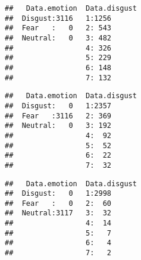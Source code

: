 \documentclass[
]{article}
\newenvironment{Shaded}{\begin{snugshade}}{\end{snugshade}}
\newcommand{\FunctionTok}[1]{\textcolor[rgb]{0.00,0.00,0.00}{#1}}
\newcommand{\NormalTok}[1]{#1}
\newcommand{\OtherTok}[1]{\textcolor[rgb]{0.56,0.35,0.01}{#1}}
\newcommand{\SpecialCharTok}[1]{\textcolor[rgb]{0.00,0.00,0.00}{#1}}
\newcommand{\StringTok}[1]{\textcolor[rgb]{0.31,0.60,0.02}{#1}}
\begin{document}
\begin{verbatim}
##   Data.emotion  Data.disgust
##  Disgust:3116   1:1256      
##  Fear   :   0   2: 543      
##  Neutral:   0   3: 482      
##                 4: 326      
##                 5: 229      
##                 6: 148      
##                 7: 132
\end{verbatim}

\begin{Shaded}
\end{Shaded}

\begin{verbatim}
##   Data.emotion  Data.disgust
##  Disgust:   0   1:2357      
##  Fear   :3116   2: 369      
##  Neutral:   0   3: 192      
##                 4:  92      
##                 5:  52      
##                 6:  22      
##                 7:  32
\end{verbatim}

\begin{Shaded}
\end{Shaded}

\begin{verbatim}
##   Data.emotion  Data.disgust
##  Disgust:   0   1:2998      
##  Fear   :   0   2:  60      
##  Neutral:3117   3:  32      
##                 4:  14      
##                 5:   7      
##                 6:   4      
##                 7:   2
\end{verbatim}
\end{document}
